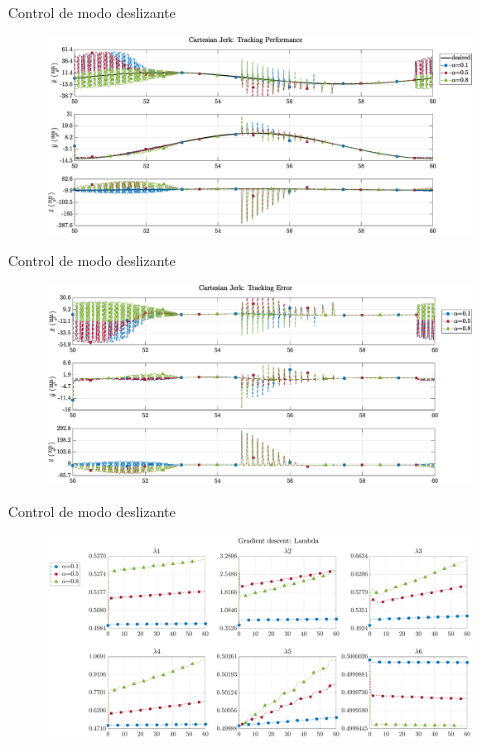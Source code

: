 \documentclass[10pt]{beamer} %
\begin{document}
	\begin{frame}[fragile]{Control de modo deslizante}
		\begin{figure}
			\centering
			\hspace*{-0.5cm}\includegraphics[width=1.1\textwidth]{img/SMCi/circular_traj/60_seg/articular_SMCi_jerk_xyz_compare.eps}
		\end{figure}
	\end{frame}
	
	\begin{frame}[fragile]{Control de modo deslizante}
		\begin{figure}
			\centering
			\hspace*{-0.5cm}\includegraphics[width=1.1\textwidth]{img/SMCi/circular_traj/60_seg/articular_SMCi_jerk_xyz_error_compare.eps}
		\end{figure}
	\end{frame}
	
	\begin{frame}[fragile]{Control de modo deslizante}
		\begin{figure}
			\centering
			\hspace*{-0.5cm}\includegraphics[width=1.1\textwidth]{img/SMCi/circular_traj/60_seg/articular_SMCi_lambda_compare.eps}
		\end{figure}
	\end{frame}
	
\end{document}
